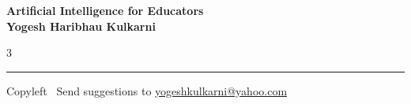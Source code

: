 \documentclass[8pt,landscape]{article}
\begin{document}
\footnotesize


\begin{center}
\Large{\textbf{Artificial Intelligence for Educators\\ Yogesh Haribhau Kulkarni}}
\end{center}

\begin{multicols}{3}

\end{multicols}

\rule{\linewidth}{0.25pt}
\scriptsize
Copyleft \textcopyleft\  Send suggestions to
\href{http://www.yogeshkulkarni.com}{yogeshkulkarni@yahoo.com}
\end{document}
